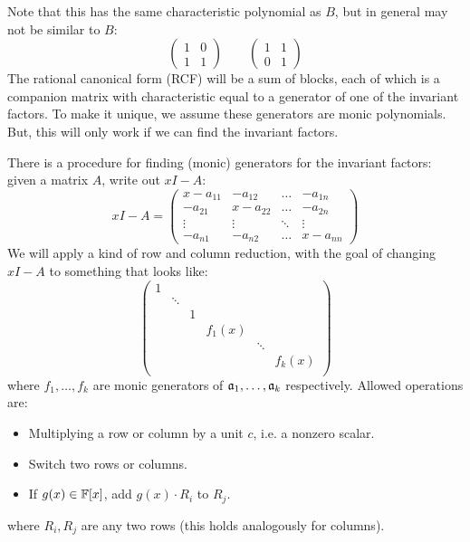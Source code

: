 Note that this has the same characteristic polynomial as $ B $, but in general
may not be similar to $ B $:
\begin{equation*}
    \begin{pmatrix}
        1 & 0 \\ 1 & 1
    \end{pmatrix}
    \qquad
    \begin{pmatrix}
        1 & 1 \\ 0 & 1
    \end{pmatrix}
\end{equation*}
The rational canonical form (RCF) will be a sum of blocks, each of which is a
companion matrix with characteristic equal to a generator of one of the
invariant factors. To make it unique, we assume these generators are monic
polynomials. But, this will only work if we can find the invariant factors.

There is a procedure for finding (monic) generators for the invariant factors:
given a matrix $ A $, write out $ xI - A $:
\begin{equation*}
    xI - A = \begin{pmatrix}
        x-a_{11} & -a_{12} & \dots & -a_{1n} \\
        -a_{21} & x-a_{22} & \dots & -a_{2n} \\
        \vdots & \vdots & \ddots & \vdots \\
        -a_{n1} & -a_{n2} & \dots & x-a_{nn}
    \end{pmatrix}
\end{equation*}
We will apply a kind of row and column reduction, with the goal of changing
$ xI - A $ to something that looks like:
\begin{equation*}
    \begin{pmatrix}
        1 &  &  &  &  & \\
        & \ddots & & & & \\
        & & 1 & & & \\
        & & & f_{1}(x) & & \\
        & & & & \ddots & \\
        & & & & & f_{k}(x) \\
    \end{pmatrix}
\end{equation*}
where $ f_{1}, \dots, f_{k} $ are monic generators of $ \mathfrak{a}_{1}, \dots,
\mathfrak{a}_{k} $ respectively.
Allowed operations are:
\begin{itemize}
    \item Multiplying a row or column by a unit $ c $, i.e. a nonzero scalar.
    \item Switch two rows or columns.
    \item If $ g(x) \in \mathbb{F}[x] $, add $ g(x)\cdot R_{i} $ to $ R_{j} $.
\end{itemize}
where $ R_{i}, R_{j} $ are any two rows (this holds analogously for columns).

